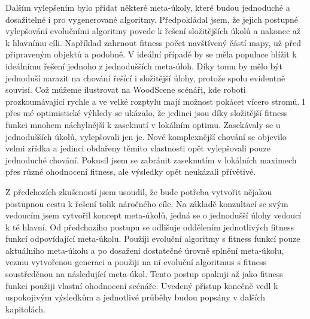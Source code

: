 \par 
Dalším vylepšením bylo přidat některé meta-úkoly, které budou jednoduché a dosažitelné i pro vygenerované algoritmy. Předpokládal jsem, že jejich postupné vylepšování evolučními algoritmy povede k řešení složitějších úkolů a nakonec až k hlavnímu cíli. Například zahrnout fitness počet navštívený částí mapy, už před připraveným objektů a podobně. V ideální případě by se měla populace blížit k ideálnímu řešení jednoho z jednodušších meta-úloh. Díky tomu by mělo být jednoduší narazit na chování řešící i složitější úlohy, protože spolu evidentně souvisí. Což můžeme ilustrovat na WoodScene scénáři, kde roboti prozkoumávající rychle a ve velké rozptylu mají možnost pokácet vícero stromů. I přes mé optimistické výhledy se ukázalo, že jedinci jsou díky složitější fitness funkci mnohem náchylnější k zaseknutí v lokálním optimu. Zasekávaly se u jednodušších úkolů, vylepšovali jen je. Nové komplexnější chování se objevilo velmi zřídka a jedinci obdařeny těmito vlastnosti opět vylepšovali pouze jednoduché chování. Pokusil jsem se zabránit zaseknutím v lokálních maximech přes různé ohodnocení fitness, ale výsledky opět neukázali přívětivé.\par
Z předchozích zkušeností jsem usoudil, že bude potřeba vytvořit nějakou postupnou cestu k řešení tolik náročného cíle.  Na základě konzultací se svým vedoucím jsem vytvořil koncept meta-úkolů, jedná se o jednodušší úlohy vedoucí k té hlavní. Od předchozího postupu se odlišuje oddělením jednotlivých fitness funkcí odpovídající meta-úkolu. Použiji evoluční algoritmy s fitness funkcí pouze aktuálního meta-úkolu a po dosažení dostatečné úrovně splnění meta-úkolu, vezmu vytvořenou generaci a použiji na ní evoluční algoritmus s fitness soustředěnou na následující meta-úkol. Tento postup opakuji až jako fitness funkci použiji vlastní ohodnocení scénáře. Uvedený přístup konečně vedl k uspokojivým výsledkům a jednotlivé průběhy budou popsány v dalších kapitolách. 
